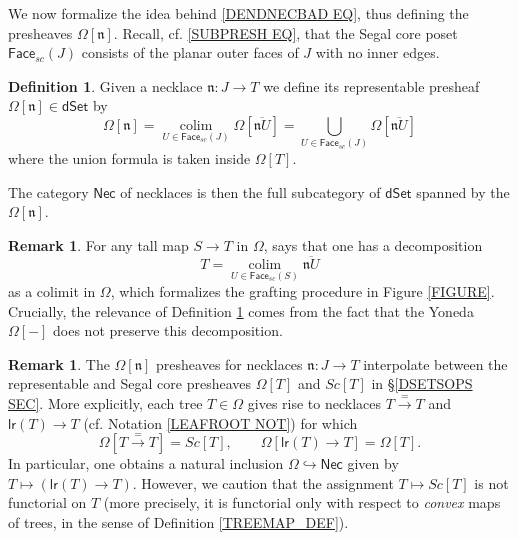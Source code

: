 \documentclass[a4paper,10pt
,draft
]{article}%
\numberwithin{equation}{section}
\numberwithin{figure}{section}
\theoremstyle{definition} %
\newtheorem{definition}[equation]{Definition}%
\newtheorem{remark}[equation]{Remark}%
\DeclareMathOperator{\colim}{colim}%
\newcommand{\1}{\ensuremath{\mathbbm 1}}%
\begin{document}
We now formalize the idea behind \eqref{DENDNECBAD EQ},
thus defining the presheaves $\Omega[\mathfrak{n}]$.
Recall, cf. \eqref{SUBPRESH EQ}, 
that the Segal core poset
$\mathsf{Face}_{sc}(J)$
consists of the planar outer faces of $J$ with no inner edges.


\begin{definition}
        \label{NECKREP_DEF}
	Given a necklace $\mathfrak{n} \colon J \to T$ 
	we define its representable presheaf
	$\Omega[\mathfrak{n}] \in \mathsf{dSet}$ by
	\begin{equation}
	\Omega[\mathfrak{n}] 
	= 
	\underset{U \in \mathsf{Face}_{sc}(J)}{\colim}
	\Omega[\overline{\mathfrak{n} U}]
	=
	\bigcup_{U \in \mathsf{Face}_{sc}(J)} 
	\Omega[\overline{\mathfrak{n} U}]
	\end{equation}
	where the union formula is taken inside $\Omega[T]$.
	
	The category $\mathsf{Nec}$ of necklaces is then the full subcategory of $\mathsf{dSet}$
	spanned by the $\Omega[\mathfrak{n}]$.
\end{definition}


\begin{remark}\label{GRAFT REM}
For any tall map $S \to T$ in $\Omega$,
\cite[Cor. 3.75]{BP_geo} says that
one has a decomposition
\[T= 
\underset{U \in \mathsf{Face}_{sc}(S)}{\colim}
\overline{\mathfrak{n} U}
\]
as a colimit in $\Omega$, 
which formalizes the grafting procedure in Figure \ref{FIGURE}.
Crucially, the relevance of Definition \ref{NECKREP_DEF} 
comes from the fact that the Yoneda $\Omega[-]$
does not preserve this decomposition.
\end{remark}



\begin{remark}\label{SEGISNEC REM}
	The $\Omega[\mathfrak{n}]$ presheaves for necklaces
	$\mathfrak{n}\colon J \to T$
	interpolate between the representable and 
	Segal core presheaves $\Omega[T]$ and $Sc[T]$
	in \S \ref{DSETSOPS SEC}.
	More explicitly,
	each tree $T \in \Omega$
	gives rise to necklaces
	$T \xrightarrow{=} T$ and
	$\mathsf{lr}(T) \to T$
	(cf. Notation \ref{LEAFROOT NOT})
	for which
\[
	\Omega[T \xrightarrow{=} T] = Sc[T],
\qquad
	\Omega[\mathsf{lr}(T) \to T] = \Omega[T].
\]
        In particular,
        one obtains a natural inclusion
        $\Omega \hookrightarrow \mathsf{Nec}$
        given by $T \mapsto \left( \mathsf{lr}(T) \to T \right)$.
        However, we caution that the assignment
        $T \mapsto Sc[T]$ is not functorial on $T$
        (more precisely, it is functorial only with respect to \emph{convex} maps of trees,
        in the sense of Definition \ref{TREEMAP_DEF}). 
\end{remark}
\end{document}
